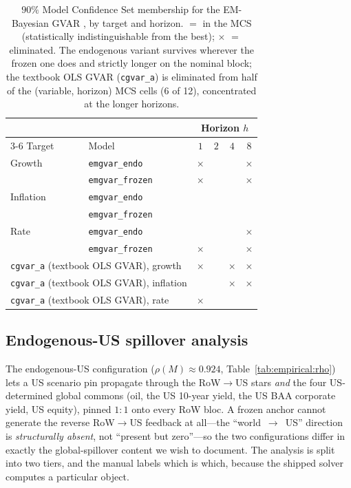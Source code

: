 \documentclass[11pt]{article}
\newcommand{\cmark}{{\color{green!55!black}\checkmark}}
\newcommand{\xmark}{{\color{red!70!black}\ensuremath{\times}}}
\theoremstyle{definition}
\theoremstyle{remark}
\begin{document}
\begin{table}[!ht]
\centering
\caption{$90\%$ Model Confidence Set membership for the EM-Bayesian GVAR
\citep{HansenLundeNason2011}, by target and horizon. \cmark{} $=$ in the
MCS (statistically indistinguishable from the best); \xmark{} $=$
eliminated. The endogenous variant survives wherever the frozen one does
and strictly longer on the nominal block; the textbook OLS GVAR
(\texttt{cgvar\_a}) is eliminated from half of the (variable, horizon) MCS
cells (6 of 12), concentrated at the longer horizons.}
\label{tab:empirical:mcs}
\begin{tabular}{llcccc}
\toprule
 & & \multicolumn{4}{c}{Horizon $h$}\\
\cmidrule(lr){3-6}
Target & Model & $1$ & $2$ & $4$ & $8$ \\
\midrule
Growth    & \texttt{emgvar\_endo}   & \xmark & \cmark & \cmark & \xmark \\
          & \texttt{emgvar\_frozen} & \xmark & \cmark & \cmark & \xmark \\
Inflation & \texttt{emgvar\_endo}   & \cmark & \cmark & \cmark & \cmark \\
          & \texttt{emgvar\_frozen} & \cmark & \cmark & \cmark & \cmark \\
Rate      & \texttt{emgvar\_endo}   & \cmark & \cmark & \cmark & \xmark \\
          & \texttt{emgvar\_frozen} & \xmark & \cmark & \cmark & \xmark \\
\midrule
\multicolumn{2}{l}{\texttt{cgvar\_a} (textbook OLS GVAR), growth}
          & \xmark & \cmark & \xmark & \xmark \\
\multicolumn{2}{l}{\texttt{cgvar\_a} (textbook OLS GVAR), inflation}
          & \cmark & \cmark & \xmark & \xmark \\
\multicolumn{2}{l}{\texttt{cgvar\_a} (textbook OLS GVAR), rate}
          & \xmark & \cmark & \cmark & \cmark \\
\bottomrule
\end{tabular}
\end{table}

\subsection{Endogenous-US spillover analysis}\label{sec:empirical:spillover}

The endogenous-US configuration ($\rho(M)\approx 0.924$,
Table~\ref{tab:empirical:rho}) lets a US scenario pin propagate through
the RoW$\to$US stars \emph{and} the four US-determined global commons
(oil, the US 10-year yield, the US BAA corporate yield, US equity),
pinned $1{:}1$ onto every RoW bloc. A frozen anchor cannot generate the
reverse RoW$\to$US feedback at all---the ``world~$\to$~US'' direction is
\emph{structurally absent}, not ``present but zero''---so the two
configurations differ in exactly the global-spillover content we wish to
document. The analysis is split into two tiers, and the manual labels
which is which, because the shipped solver computes a particular object.
\end{document}
